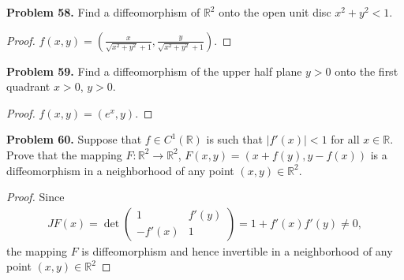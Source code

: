 \documentclass[12pt,leqno]{amsart}
\theoremstyle{definition}
\begin{document}
\medskip

\noindent
{\bf Problem 58.}
Find a diffeomorphism of $\mathbb{R}^2$ onto the open unit disc $x^2+y^2<1$.
\begin{proof}
$f(x,y) = \left(\frac{x}{\sqrt{x^2+y^2}+1}, \frac{y}{\sqrt{x^2+y^2}+1}\right)$.
\end{proof}

\medskip

\noindent
{\bf Problem 59.}
Find a diffeomorphism of the upper half plane $y>0$ onto the first quadrant
$x>0$, $y>0$.
\begin{proof}
$f(x,y) = \left(e^x, y\right)$.
\end{proof}

\medskip

\noindent
{\bf Problem 60.}
Suppose that $f\in C^1(\mathbb{R})$ is such that $|f'(x)|<1$ for all $x\in\mathbb{R}$.
Prove that the mapping $F:\mathbb{R}^2\to\mathbb{R}^2$,
$F(x,y)=(x+f(y), y-f(x))$
is a diffeomorphism in a neighborhood of any point $(x,y)\in\mathbb{R}^2$.
\begin{proof}
Since
\begin{align*}
    JF(x) = \det \begin{pmatrix}
        1 & f'(y) \\
        - f'(x) & 1
    \end{pmatrix} = 1 + f'(x)f'(y) \neq 0,
\end{align*}
the mapping $F$ is diffeomorphism and hence invertible in a neighborhood of any point $(x,y) \in \mathbb{R}^2$
\end{proof}

\medskip
\end{document}

